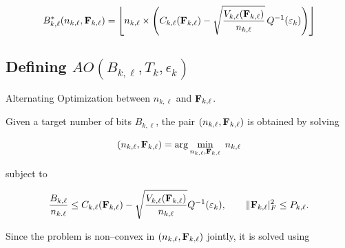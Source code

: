 \documentclass[a4paper, 12pt, onecolumn, journal, twoside, draftclsnofoot]{IEEEtran}
\begin{document}
\begin{equation*}
B^*_{k,\ell}(n_{k,\ell}, {\bf F}_{k, \ell})
=
\left\lfloor
n_{k,\ell} \times
\left(
C_{k,\ell}({\bf F}_{k, \ell})
-
\sqrt{\frac{V_{k,\ell}({\bf F}_{k, \ell})}{n_{k,\ell}}}
\,Q^{-1}(\varepsilon_k)
\right)
\right\rfloor
\end{equation*}

\subsection {Defining  $AO(B_{k, \ell}, T_k, \epsilon_k)$ }

Alternating Optimization between $n_{k,\ell}$ and ${\bf F}_{k, \ell}$.

Given a target number of bits $B_{k,\ell}$, the pair $(n_{k,\ell},{\bf F}_{k, \ell} )$ is obtained by solving

\begin{equation}
(n_{k,\ell},{\bf F}_{k, \ell} ) =
\arg\min_{n_{k,\ell},{\bf F}_{k, \ell} } \; n_{k,\ell}
\end{equation}

subject to

\begin{equation}
\frac{B_{k,\ell}}{n_{k.\ell}}
\le
C_{k,\ell}({\bf F}_{k, \ell} )
-
\sqrt{\frac{V_{k,\ell}({\bf F}_{k, \ell} )}{n_{k,\ell}}}
Q^{-1}(\varepsilon_k),
\qquad
\|{\bf F}_{k, \ell} |_F^2 \le P_{k,\ell}.
\end{equation}

Since the problem is non–convex in $(n_{k, \ell},{\bf F}_{k, \ell})$ jointly, it is solved using 
\end{document}

